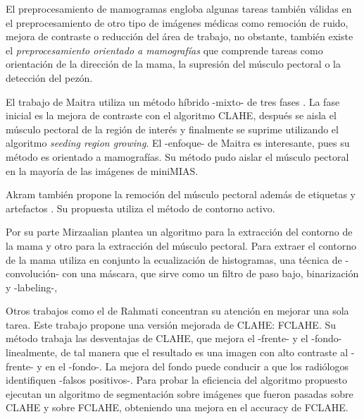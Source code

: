 El preprocesamiento de mamogramas engloba algunas tareas también válidas en
el preprocesamiento de otro tipo de imágenes médicas como remoción de ruido,
mejora de contraste o reducción del área de trabajo, no obstante, también
existe el \textit{preprocesamiento orientado a mamografías} que comprende
tareas como orientación de la dirección de la mama, la supresión del músculo
pectoral o la detección del pezón.


El trabajo de Maitra utiliza un método híbrido -mixto- de tres fases
\cite{maitra2012technique}. La fase inicial es la mejora de contraste con el
algoritmo CLAHE, después se aisla el músculo pectoral de la región de interés y
finalmente se suprime utilizando el algoritmo \textit{seeding region growing}.
El -enfoque- de Maitra es interesante, pues su método es orientado a
mamografías. Su método pudo aislar el músculo pectoral en la mayoría de las
imágenes de miniMIAS.

Akram también propone la remoción del músculo pectoral además de etiquetas y
artefactos \cite{akram2013preprocessing}. Su propuesta utiliza el método de
contorno activo. 

Por su parte Mirzaalian \cite{mirzaalian2007pre} plantea un algoritmo para la
extracción del contorno de la mama y otro para la extracción del músculo
pectoral. Para extraer el contorno de la mama utiliza en conjunto la
ecualización de histogramas, una técnica de -convolución- con una máscara, que
sirve como un filtro de paso bajo, binarización y -labeling-, 


Otros trabajos como el de Rahmati \cite{rahmati2010new} concentran su atención en
mejorar una sola tarea. Este trabajo propone una versión mejorada de CLAHE:
FCLAHE. Su método trabaja las desventajas de CLAHE, que mejora el -frente- y el
-fondo- linealmente, de tal manera que el resultado es una imagen con alto
contraste al -frente- y en el -fondo-. La mejora del fondo puede conducir a que
los radiólogos identifiquen -falsos positivos-. Para probar la eficiencia del
algoritmo propuesto ejecutan un algoritmo de segmentación sobre imágenes que
fueron pasadas sobre CLAHE y sobre FCLAHE, obteniendo una mejora en el accuracy
de FCLAHE.

